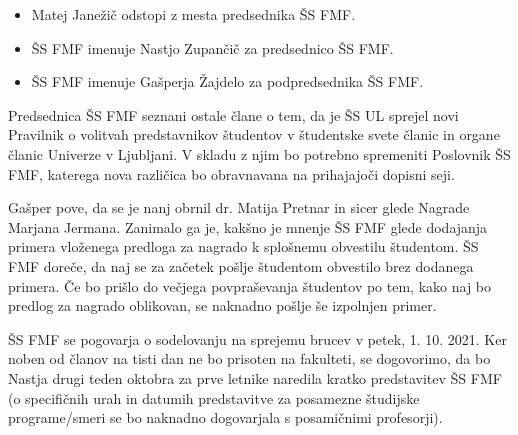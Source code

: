 \documentclass{seja}
\begin{document}
\begin{ad}
    \item
    \begin{sklep*}
        \begin{itemize}
            \item Matej Janežič odstopi z mesta predsednika ŠS FMF.    
        \end{itemize}
    \end{sklep*}
    
    \begin{sklep*}
        \begin{itemize}
            \item ŠS FMF imenuje Nastjo Zupančič za predsednico ŠS FMF.
            \item ŠS FMF imenuje Gašperja Žajdelo za podpredsednika ŠS FMF.
        \end{itemize}
    \end{sklep*}
    
    \item
    Predsednica ŠS FMF seznani ostale člane o tem, da je ŠS UL sprejel novi Pravilnik o volitvah predstavnikov študentov v študentske svete članic in organe članic Univerze v Ljubljani. V skladu z njim bo potrebno spremeniti Poslovnik ŠS FMF, katerega nova različica bo obravnavana na prihajajoči dopisni seji. 
    
    \item
    Gašper pove, da se je nanj obrnil dr. Matija Pretnar in sicer glede Nagrade Marjana Jermana. Zanimalo ga je, kakšno je mnenje ŠS FMF glede dodajanja primera vloženega predloga za nagrado k splošnemu obvestilu študentom. ŠS FMF doreče, da naj se za začetek pošlje študentom obvestilo brez dodanega primera. Če bo prišlo do večjega povpraševanja študentov po tem, kako naj bo predlog za nagrado oblikovan, se naknadno pošlje še izpolnjen primer.
    
    ŠS FMF se pogovarja o sodelovanju na sprejemu brucev v petek, 1. 10. 2021. Ker noben od članov na tisti dan ne bo prisoten na fakulteti, se dogovorimo, da bo Nastja drugi teden oktobra za prve letnike naredila kratko predstavitev ŠS FMF (o specifičnih urah in datumih predstavitve za posamezne študijske programe/smeri se bo naknadno  dogovarjala s posamičnimi profesorji).
    
\end{ad}
\end{document}

